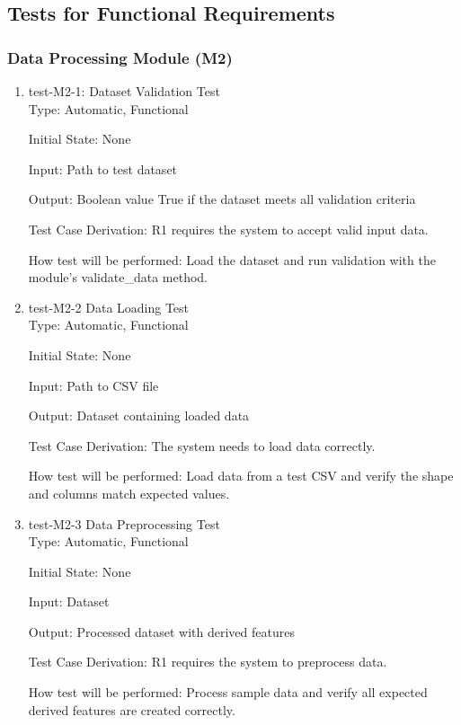 \documentclass[12pt, titlepage]{article}
\begin{document}
\subsection{Tests for Functional Requirements}


\subsubsection{Data Processing Module (M2)}

\begin{enumerate}
  \item{test-M2-1: Dataset Validation Test\\}
  Type: Automatic, Functional
            
  Initial State: None
            
  Input: Path to test dataset
            
  Output: Boolean value True if the dataset meets all validation criteria

  Test Case Derivation: R1 requires the system to accept valid input data.
  
  How test will be performed: 
  Load the dataset and run validation with the module's validate\_data method.

  \item{test-M2-2 Data Loading Test\\}
  Type: Automatic, Functional

  Initial State: None

  Input: Path to CSV file

  Output: Dataset containing loaded data

  Test Case Derivation: The system needs to load data correctly.

  How test will be performed: Load data from a test CSV and verify the shape and columns match expected values.

  \item{test-M2-3 Data Preprocessing Test\\}
  Type: Automatic, Functional

  Initial State: None

  Input: Dataset

  Output: Processed dataset with derived features

  Test Case Derivation: R1 requires the system to preprocess data.

  How test will be performed: Process sample data and verify all expected derived features are created correctly.


\end{enumerate}
\end{document}
